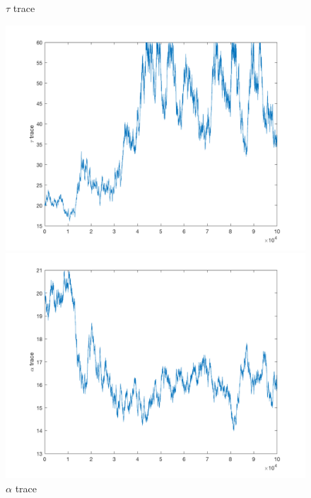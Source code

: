 \documentclass{siamart1116}
\begin{document}
\begin{figure}[!htb]
    \begin{minipage}{0.48\textwidth}
        \centering
        \caption{\label{fig:centered_truncated_tau} $\tau$ trace}
        \includegraphics[width=\linewidth]{graphics/centered/trace_tau.png}
    \end{minipage} \hfill
    \begin{minipage}{0.48\textwidth}
        \centering
        \caption{\label{fig:centered_truncated_alpha} $\alpha$ trace}
        \includegraphics[width=\linewidth]{graphics/centered/trace_alpha.png}
    \end{minipage}
\end{figure}
\end{document}
